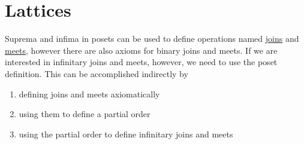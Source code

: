 \section{Lattices}\label{sec:lattices}

\begin{note}\label{note:infinite_join_meet}
  Suprema and infima in posets can be used to define operations named \uline{joins} and \uline{meets}, however there are also axioms for binary joins and meets. If we are interested in infinitary joins and meets, however, we need to use the poset definition. This can be accomplished indirectly by
  \begin{enumerate}
    \item defining joins and meets axiomatically
    \item using them to define a partial order
    \item using the partial order to define infinitary joins and meets
  \end{enumerate}
\end{note}

